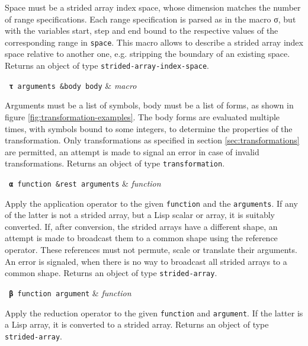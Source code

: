 Space must be a strided array index space, whose dimension matches the
number of range specifications. Each range specification is parsed as in
the macro σ, but with the variables start, step and end bound to the
respective values of the corresponding range in \texttt{space}. This macro
allows to describe a strided array index space relative to another one,
e.g. stripping the boundary of an existing space. Returns an object of type
\texttt{strided-array-index-space}.

\begin{function}
  \texttt{ \textbf{τ} arguments \&body body} & \textsl{macro} \\
\end{function}

Arguments must be a list of symbols, body must be a list of forms, as shown
in figure \ref{fig:transformation-examples}. The body forms are evaluated
multiple times, with symbols bound to some integers, to determine the
properties of the transformation. Only transformations as specified in
section \ref{sec:transformations} are permitted, an attempt is made to
signal an error in case of invalid transformations. Returns an object of
type \texttt{transformation}.

\begin{function}
  \texttt{ \textbf{α} function \&rest arguments} & \textsl{function} \\
\end{function}

Apply the application operator to the given \texttt{function} and the
\texttt{arguments}. If any of the latter is not a strided array, but a Lisp
scalar or array, it is suitably converted. If, after conversion, the
strided arrays have a different shape, an attempt is made to broadcast them
to a common shape using the reference operator. These references must not
permute, scale or translate their arguments. An error is signaled, when
there is no way to broadcast all strided arrays to a common shape. Returns
an object of type \texttt{strided-array}.

\begin{function}
  \texttt{ \textbf{β} function argument} & \textsl{function} \\
\end{function}

Apply the reduction operator to the given \texttt{function} and
\texttt{argument}. If the latter is a Lisp array, it is converted to a
strided array. Returns an object of type \texttt{strided-array}.


